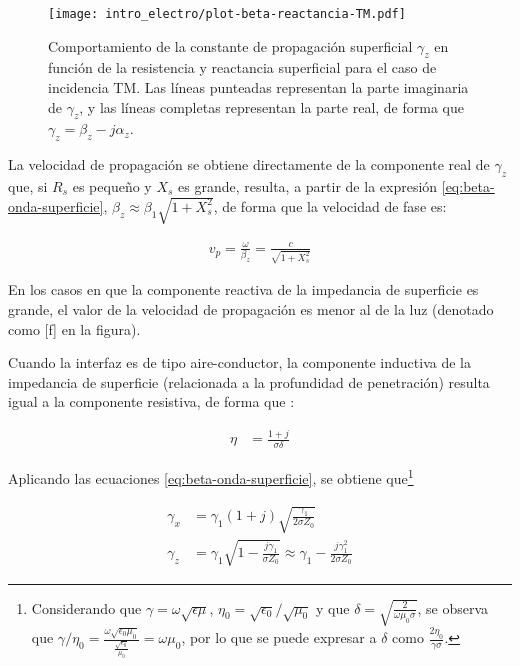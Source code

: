 \begin{figure}[htp]
	\centering
	\texttt{[image: intro\_electro/plot-beta-reactancia-TM.pdf]}
	\caption{Comportamiento de la constante de propagación superficial $\gamma_z$ en función de la resistencia y reactancia superficial para el caso de incidencia TM. Las líneas punteadas representan la parte imaginaria de $\gamma_z$, y las líneas completas representan la parte real, de forma que $\gamma_z = \beta_z - j\alpha_z$.}
	\label{fig:beta-reactancia-TM}
\end{figure}

La velocidad de propagación se obtiene directamente de la componente real de $\gamma_z$ que, si $R_s$ es pequeño y $X_s$ es grande, resulta, a partir de la expresión \ref{eq:beta-onda-superficie}, $\beta_z \approx \beta_1 \sqrt{1+X_s^2}$, de forma que la velocidad de fase es:

\begin{align}
	v_p = \frac{\omega}{\beta_z} = \frac{c}{\sqrt{1+X_s^2}}
\end{align}

En los casos en que la componente reactiva de la impedancia de superficie es grande, el valor de la velocidad de propagación es menor al de la luz (denotado como [f] en la figura).


Cuando la interfaz es de tipo aire-conductor, la componente inductiva de la impedancia de superficie (relacionada a la profundidad de penetración) resulta igual a la componente resistiva, de forma que \cite{Fernandez:Electromag}:

\begin{align}
	\eta &= \frac{1+j}{\sigma \delta}
\end{align}
 
Aplicando las ecuaciones \ref{eq:beta-onda-superficie}, se obtiene que\footnote{Considerando que $\gamma=\omega\sqrt{\epsilon \mu}$, $\eta_0=\sqrt{\epsilon_0}/\sqrt{\mu_0}$ y que $\delta=\sqrt{\frac{2}{\omega \mu_0 \sigma}}$, se observa que $\gamma/\eta_0=\frac{\omega \sqrt{\epsilon_0 \mu_0}}{\frac{\sqrt{\epsilon_0}}{\mu_0}}=\omega \mu_0$, por lo que se puede expresar a $\delta$ como $\frac{2 \eta_0}{\gamma \sigma}$.}

\begin{align}
	\gamma_x &= \gamma_1 (1+j) \sqrt{\frac{\gamma_1}{2 \sigma Z_0}} \\
	\gamma_z &= \gamma_1 \sqrt{1-\frac{j \gamma_1}{\sigma Z_0}} \approx \gamma_1 - \frac{j  \gamma_1^2}{2 \sigma Z_0}
\end{align}

